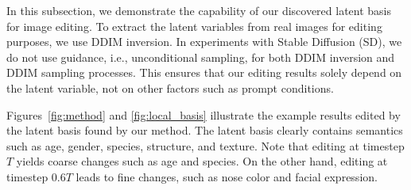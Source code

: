 In this subsection, we demonstrate the capability of our discovered latent basis for image editing. 
To extract the latent variables from real images for editing purposes, we use DDIM inversion.
In experiments with Stable Diffusion (SD), we do not use guidance, i.e., unconditional sampling, for both DDIM inversion and DDIM sampling processes.
This ensures that our editing results solely depend on the latent variable, not on other factors such as prompt conditions.


Figures~\ref{fig:method} and \ref{fig:local_basis} illustrate the example results edited by the latent basis found by our method.
The latent basis clearly contains semantics such as age, gender, species, structure, and texture. 
{Note that editing at timestep $T$ yields coarse changes such as age and species. On the other hand, editing at timestep $0.6T$ leads to fine changes, such as nose color and facial expression.} 


